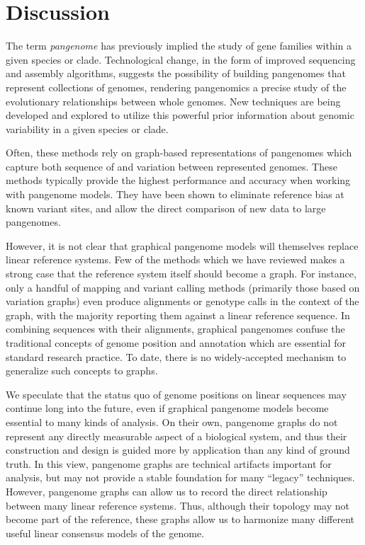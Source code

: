 \section{Discussion}

The term \emph{pangenome} has previously implied the study of gene families within a given species or clade.
Technological change, in the form of improved sequencing and assembly algorithms, suggests the possibility of building pangenomes that represent collections of genomes, rendering pangenomics a precise study of the evolutionary relationships between whole genomes.
New techniques are being developed and explored to utilize this powerful prior information about genomic variability in a given species or clade.

Often, these methods rely on graph-based representations of pangenomes which capture both sequence of and variation between represented genomes.
These methods typically provide the highest performance and accuracy when working with pangenome models.
They have been shown to eliminate reference bias at known variant sites, and allow the direct comparison of new data to large pangenomes.

However, it is not clear that graphical pangenome models will themselves replace linear reference systems.
Few of the methods which we have reviewed makes a strong case that the reference system itself should become a graph.
For instance, only a handful of mapping and variant calling methods (primarily those based on variation graphs) even produce alignments or genotype calls in the context of the graph, with the majority reporting them against a linear reference sequence.
In combining sequences with their alignments, graphical pangenomes confuse the traditional concepts of genome position and annotation which are essential for standard research practice.
To date, there is no widely-accepted mechanism to generalize such concepts to graphs.

We speculate that the status quo of genome positions on linear sequences may continue long into the future, even if graphical pangenome models become essential to many kinds of analysis.
On their own, pangenome graphs do not represent any directly measurable aspect of a biological system, and thus their construction and design is guided more by application than any kind of ground truth.
In this view, pangenome graphs are technical artifacts important for analysis, but may not provide a stable foundation for many ``legacy'' techniques.
However, pangenome graphs can allow us to record the direct relationship between many linear reference systems.
Thus, although their topology may not become part of the reference, these graphs allow us to harmonize many different useful linear consensus models of the genome.

